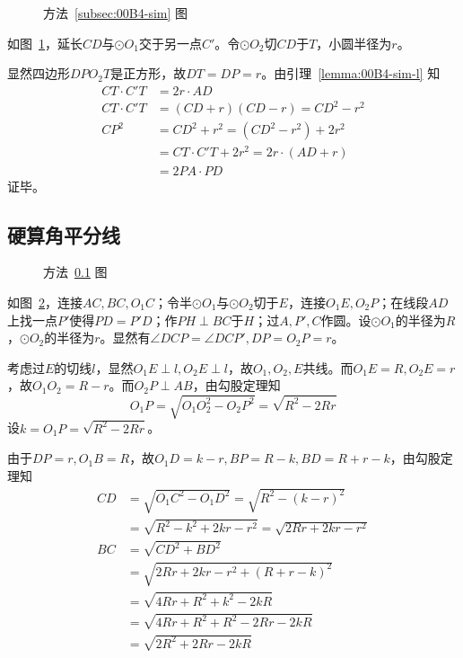 \begin{figure}[htbp]
  \centering {}
  \caption{方法~\ref{subsec:00B4-sim} 图}
  \label{fig:00B4-sim}
\end{figure}

如图~\ref{fig:00B4-sim}，延长$CD$与$\odot O_1$交于另一点$C'$。令$\odot O_2$切$CD$于$T$，小圆半径为$r$。

显然四边形$DPO_2T$是正方形，故$DT = DP = r$。由引理~\ref{lemma:00B4-sim-l} 知
\begin{align*}
  CT \cdot C'T &= 2r \cdot AD \\
  CT \cdot C'T &= (CD + r)(CD - r) = CD^2 - r^2 \\
  CP^2 &= CD^2 + r^2 = \left(CD^2 - r^2\right) + 2r^2 \\
  &= CT \cdot C'T + 2r^2 = 2r \cdot (AD + r) \\
  &= 2PA \cdot PD
\end{align*}
证毕。

\subsection{硬算角平分线} \label{subsec:00B4-bis}

\begin{figure}[htbp]
  \centering {}
  \caption{方法~\ref{subsec:00B4-bis} 图}
  \label{fig:00B4-bis}
\end{figure}

如图~\ref{fig:00B4-bis}，连接$AC, BC, O_1C$；令半$\odot O_1$与$\odot O_2$切于$E$，连接$O_1E, O_2P$；在线段$AD$上找一点$P'$使得$PD = P'D$；作$PH \perp BC$于$H$；过$A, P', C$作圆。设$\odot O_1$的半径为$R$，$\odot O_2$的半径为$r$。显然有$\angle DCP = \angle DCP', DP = O_2P = r$。

考虑过$E$的切线$l$，显然$O_1E \perp l, O_2E \perp l$，故$O_1, O_2, E$共线。而$O_1E = R, O_2E = r$，故$O_1O_2 = R - r$。而$O_2P \perp AB$，由勾股定理知
\[ O_1P = \sqrt{O_1O_2^2 - O_2P^2} = \sqrt{R^2 - 2Rr} \]
设$k = O_1P = \sqrt{R^2 - 2Rr}$。

由于$DP = r, O_1B = R$，故$O_1D = k - r, BP = R - k, BD = R + r - k$，由勾股定理知
\begin{align*}
  CD &= \sqrt{O_1C^2 - O_1D^2} = \sqrt{R^2 - (k - r)^2} \\
  &= \sqrt{R^2 - k^2 + 2kr - r^2} = \sqrt{2Rr + 2kr - r^2} \\
  BC &= \sqrt{CD^2 + BD^2} \\
  &= \sqrt{2Rr + 2kr - r^2 + (R + r - k)^2} \\
  &= \sqrt{4Rr + R^2 + k^2 - 2kR} \\
  &= \sqrt{4Rr + R^2 + R^2 - 2Rr - 2kR} \\
  &= \sqrt{2R^2 + 2Rr - 2kR}
\end{align*}


